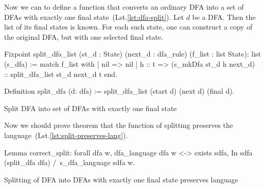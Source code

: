 

Now we can to define a function that converts an ordinary DFA into a set of DFAs with exactly one final state~(Lst.\ref{lst:dfa-split}).
Let $d$ be a DFA. Then the list of its final states is known. 
For each such state, one can construct a copy of the original DFA, but with one selected final state.

\begin{listing}[h]
    \begin{pyglist}[language=coq, numbers=none, numbersep=5pt]
  Fixpoint split_dfa_list 
      (st_d : State) 
      (next_d : dfa_rule) 
      (f_list : list State): list (s_dfa) :=
    match f_list with
    | nil => nil
    | h :: t => (s_mkDfa st_d h next_d) 
                :: split_dfa_list st_d next_d t
    end.    
 
 Definition split_dfa (d: dfa) := 
   split_dfa_list (start d) (next d) (final d).
    \end{pyglist}
    \caption{Split DFA into set of DFAs with exactly one final state}
    \label{lst:dfa-split}
\end{listing}










Now we should prove theorem that the function of splitting preserves the language~(Lst.\ref{lst:split-preserves-lang}).

\begin{listing}[h]
    \begin{pyglist}[language=coq, numbers=none, numbersep=5pt]
  Lemma correct_split:
    forall dfa w,
      dfa_language dfa w <->
      exists sdfa, 
         In sdfa (split_dfa dfa) /\ 
         s_dfa_language sdfa w.
    \end{pyglist}
    \caption{Splitting of DFA into DFAs with exactly one final state preserves language}
    \label{lst:split-preserves-lang}
\end{listing}

